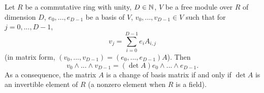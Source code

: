 \begin{proposition}
  Let
    $R$ be a commutative ring with unity,
    $D \in \mathbb{N}$,
    $V$ be a free module over $R$ of dimension $D$,
    $e_0, ..., e_{D - 1}$ be a basis of $V$,
    $v_0, ..., v_{D - 1} \in V$ such that for $j = 0, ..., D - 1$,
  \begin{equation}
    v_j = \sum_{i = 0}^{D - 1} e_i A_{i, j}
  \end{equation}
  (in matrix form, $(v_0, ..., v_{D - 1}) = (e_0, ..., e_{D - 1}) A$).
  Then
  \begin{equation}
    v_0 \wedge ... \wedge v_{D - 1} = (\det A) e_0 \wedge ... \wedge e_{D - 1}.
  \end{equation}
  As a consequence, the matrix $A$ is a change of basis matrix if and only if
  $\det A$ is an invertible element of $R$
  (a nonzero element when $R$ is a field).
\end{proposition}

